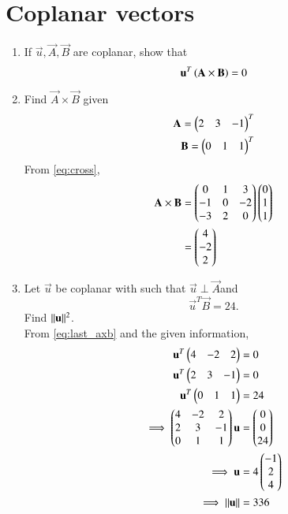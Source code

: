 \documentclass[journal,12pt,twocolumn]{IEEEtran}
\renewcommand\thesection{\arabic{section}}
\begin{document}
\section{Coplanar vectors}
\begin{enumerate}[label=\thesection.\arabic*
,ref=\thesection.\theenumi]
\item If $\vec{u}, \vec{A}, \vec{B}$ are coplanar, show that
\begin{equation}
\mathbf{u}^T\left(\mathbf{A}\times \mathbf{B}\right) = 0
\label{eq:coplanar}
\end{equation}
%
\item Find $\vec{A}\times \vec{B}$ given
\begin{align}
\mathbf{A}=\begin{pmatrix}2 & 3 & -1\end{pmatrix}^T
\\
\mathbf{B}=\begin{pmatrix}0 & 1 & 1\end{pmatrix}^T
\end{align}
\solution From \eqref{eq:cross},
\begin{align}
\mathbf{A}\times \mathbf{B} &= \begin{pmatrix}0 & 1& 3 \\ -1 & 0 & -2 \\ -3 & 2 & 0\end{pmatrix}\begin{pmatrix}0 \\ 1 \\ 1\end{pmatrix}
\\
&= \begin{pmatrix}4 \\ -2 \\ 2\end{pmatrix}
\label{eq:last_axb}
\end{align}

\item Let $\vec{u}$ be coplanar with 
%
such that $\vec{u}\perp\vec{A}$and
\begin{equation}
\vec{u}^T\vec{B} = 24.
\label{eq:uB}
\end{equation}
Find $\lVert\mathbf{u}\rVert^2$.
\\
\solution From \eqref{eq:last_axb} and the given information,
\begin{align}
\mathbf{u}^T\begin{pmatrix}4 & -2 & 2\end{pmatrix} &=0
\\
\mathbf{u}^T\begin{pmatrix}2 & 3 & -1\end{pmatrix} &=0
\\
\mathbf{u}^T\begin{pmatrix}0 & 1 & 1\end{pmatrix} &=24
\\
\implies \begin{pmatrix}4 & -2 & 2
\\
2 & 3 & -1
\\
0 & 1 & 1
\end{pmatrix}\mathbf{u}
&= \begin{pmatrix}0 \\ 0 \\ 24\end{pmatrix}
\\
\implies 
\mathbf{u} &= 4 \begin{pmatrix}-1 \\ 2 \\ 4\end{pmatrix}
\\
\implies \lVert\mathbf{u}\rVert &= 336
\end{align}
\end{enumerate}
\end{document}
